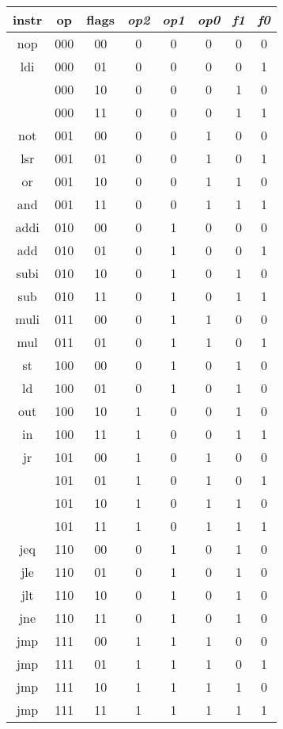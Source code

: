 \documentclass[twoside, 12pt, a4paper]{article}
\begin{document}
\begin{center}
	\ttfamily
	\begin{tabular}{|c|c|c|c|c|c|c|c|}
		\hline
		instr	& op & flags & \textit{op2} & \textit{op1} & \textit{op0} & \textit{f1} & \textit{f0}\\
            \hline
		nop		& 000 & 00 & 0 & 0 & 0 & 0 & 0 \\
		ldi		& 000 & 01 & 0 & 0 & 0 & 0 & 1 \\
				  & 000 & 10 & 0 & 0 & 0 & 1 & 0 \\
				  & 000 & 11 & 0 & 0 & 0 & 1 & 1 \\
		\hline
		not		& 001 & 00 & 0 & 0 & 1 & 0 & 0 \\
		lsr		& 001 & 01 & 0 & 0 & 1 & 0 & 1 \\
		or		& 001 & 10 & 0 & 0 & 1 & 1 & 0 \\
		and		& 001 & 11 & 0 & 0 & 1 & 1 & 1 \\
		\hline
		addi	& 010 & 00 & 0 & 1 & 0 & 0 & 0 \\
		add		& 010 & 01 & 0 & 1 & 0 & 0 & 1 \\
		subi	& 010 & 10 & 0 & 1 & 0 & 1 & 0 \\
		sub		& 010 & 11 & 0 & 1 & 0 & 1 & 1 \\
		\hline
		muli	& 011 & 00 & 0 & 1 & 1 & 0 & 0 \\
		mul		& 011 & 01 & 0 & 1 & 1 & 0 & 1 \\
		\hline
		st		& 100 & 00 & 0 & 1 & 0 & 1 & 0 \\
		ld		& 100 & 01 & 0 & 1 & 0 & 1 & 0 \\
		out		& 100 & 10 & 1 & 0 & 0 & 1 & 0 \\
		in		& 100 & 11 & 1 & 0 & 0 & 1 & 1 \\
		\hline
		jr		& 101 & 00 & 1 & 0 & 1 & 0 & 0 \\
				  & 101 & 01 & 1 & 0 & 1 & 0 & 1 \\
				  & 101 & 10 & 1 & 0 & 1 & 1 & 0 \\
				  & 101 & 11 & 1 & 0 & 1 & 1 & 1 \\
		\hline
		jeq		& 110 & 00 & 0 & 1 & 0 & 1 & 0 \\
		jle		& 110 & 01 & 0 & 1 & 0 & 1 & 0 \\
		jlt		& 110 & 10 & 0 & 1 & 0 & 1 & 0 \\
		jne		& 110 & 11 & 0 & 1 & 0 & 1 & 0 \\
		\hline
		jmp		& 111 & 00 & 1 & 1 & 1 & 0 & 0 \\
		jmp		& 111 & 01 & 1 & 1 & 1 & 0 & 1 \\
		jmp		& 111 & 10 & 1 & 1 & 1 & 1 & 0 \\
		jmp		& 111 & 11 & 1 & 1 & 1 & 1 & 1 \\
		\hline
	\end{tabular}
\end{center}
\end{document}
